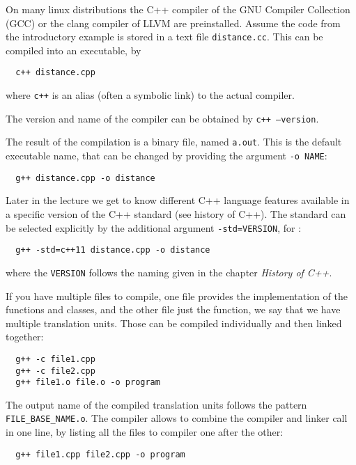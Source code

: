 On many linux distributions the C++ compiler of the GNU Compiler Collection (GCC) or the clang compiler of LLVM are preinstalled.
Assume the code from the introductory example is stored in a text file \texttt{distance.cc}. This can be compiled into an executable, by
%
\begin{verbatim}
  c++ distance.cpp
\end{verbatim}
%
where \texttt{c++} is an alias (often a symbolic link) to the actual compiler.

\begin{rem}
  The version and name of the compiler can be obtained by \texttt{c++ --version}.
\end{rem}

The result of the compilation is a binary file, named \texttt{a.out}. This is the default executable name, that can be changed by
providing the argument \texttt{-o NAME}:
%
\begin{verbatim}
  g++ distance.cpp -o distance
\end{verbatim}
%
Later in the lecture we get to know different C++ language features available in a specific version of the C++ standard (see history of C++).
The standard can be selected explicitly by the additional argument \texttt{-std=VERSION}, \eg for :
%
\begin{verbatim}
  g++ -std=c++11 distance.cpp -o distance
\end{verbatim}
%
where the \texttt{VERSION} follows the naming given in the chapter \emph{History of C++}.

If you have multiple files to compile, \eg one file provides the implementation of the functions and classes, and the other file just
the  function, we say that we have multiple translation units. Those can be compiled individually and then linked together:
%
\begin{verbatim}
  g++ -c file1.cpp
  g++ -c file2.cpp
  g++ file1.o file.o -o program
\end{verbatim}
%
The output name of the compiled translation units follows the pattern \texttt{FILE\_BASE\_NAME.o}. The compiler allows to combine the compiler
and linker call in one line, by listing all the files to compiler one after the other:
%
\begin{verbatim}
  g++ file1.cpp file2.cpp -o program
\end{verbatim}

